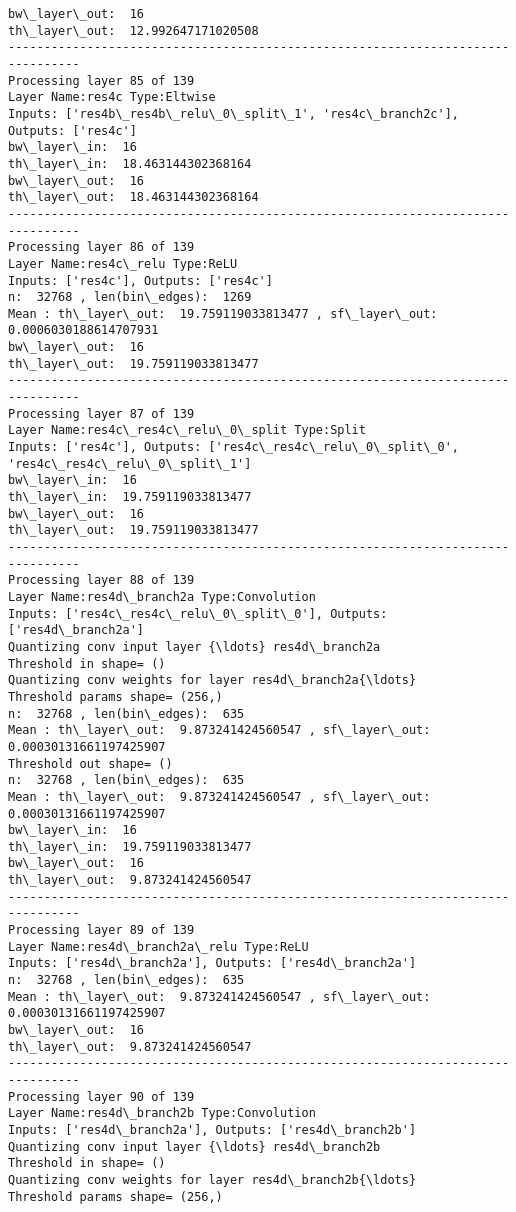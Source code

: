 \documentclass[11pt]{article}
\begin{document}
\begin{Verbatim}[commandchars=\\\{\}]
bw\_layer\_out:  16
th\_layer\_out:  12.992647171020508
--------------------------------------------------------------------------------
Processing layer 85 of 139
Layer Name:res4c Type:Eltwise
Inputs: ['res4b\_res4b\_relu\_0\_split\_1', 'res4c\_branch2c'], Outputs: ['res4c']
bw\_layer\_in:  16
th\_layer\_in:  18.463144302368164
bw\_layer\_out:  16
th\_layer\_out:  18.463144302368164
--------------------------------------------------------------------------------
Processing layer 86 of 139
Layer Name:res4c\_relu Type:ReLU
Inputs: ['res4c'], Outputs: ['res4c']
n:  32768 , len(bin\_edges):  1269
Mean : th\_layer\_out:  19.759119033813477 , sf\_layer\_out:  0.0006030188614707931
bw\_layer\_out:  16
th\_layer\_out:  19.759119033813477
--------------------------------------------------------------------------------
Processing layer 87 of 139
Layer Name:res4c\_res4c\_relu\_0\_split Type:Split
Inputs: ['res4c'], Outputs: ['res4c\_res4c\_relu\_0\_split\_0', 'res4c\_res4c\_relu\_0\_split\_1']
bw\_layer\_in:  16
th\_layer\_in:  19.759119033813477
bw\_layer\_out:  16
th\_layer\_out:  19.759119033813477
--------------------------------------------------------------------------------
Processing layer 88 of 139
Layer Name:res4d\_branch2a Type:Convolution
Inputs: ['res4c\_res4c\_relu\_0\_split\_0'], Outputs: ['res4d\_branch2a']
Quantizing conv input layer {\ldots} res4d\_branch2a
Threshold in shape= ()
Quantizing conv weights for layer res4d\_branch2a{\ldots}
Threshold params shape= (256,)
n:  32768 , len(bin\_edges):  635
Mean : th\_layer\_out:  9.873241424560547 , sf\_layer\_out:  0.00030131661197425907
Threshold out shape= ()
n:  32768 , len(bin\_edges):  635
Mean : th\_layer\_out:  9.873241424560547 , sf\_layer\_out:  0.00030131661197425907
bw\_layer\_in:  16
th\_layer\_in:  19.759119033813477
bw\_layer\_out:  16
th\_layer\_out:  9.873241424560547
--------------------------------------------------------------------------------
Processing layer 89 of 139
Layer Name:res4d\_branch2a\_relu Type:ReLU
Inputs: ['res4d\_branch2a'], Outputs: ['res4d\_branch2a']
n:  32768 , len(bin\_edges):  635
Mean : th\_layer\_out:  9.873241424560547 , sf\_layer\_out:  0.00030131661197425907
bw\_layer\_out:  16
th\_layer\_out:  9.873241424560547
--------------------------------------------------------------------------------
Processing layer 90 of 139
Layer Name:res4d\_branch2b Type:Convolution
Inputs: ['res4d\_branch2a'], Outputs: ['res4d\_branch2b']
Quantizing conv input layer {\ldots} res4d\_branch2b
Threshold in shape= ()
Quantizing conv weights for layer res4d\_branch2b{\ldots}
Threshold params shape= (256,)

\end{Verbatim}
\end{document}
